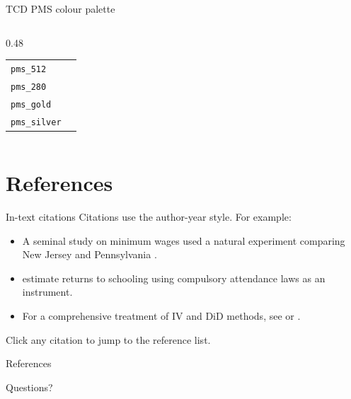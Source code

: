 \documentclass[aspectratio=169]{beamer}
\begin{document}
\begin{frame}{TCD PMS colour palette}
\begin{columns}[t]
\begin{column}{0.48\textwidth}
\begin{tabular}{ll}
      \texttt{pms\_512}      & \cellcolor{pms_512}\hspace{2cm} \\
      \texttt{pms\_280}      & \cellcolor{pms_280}\hspace{2cm} \\
      \texttt{pms\_gold}     & \cellcolor{pms_gold}\hspace{2cm} \\
      \texttt{pms\_silver}   & \cellcolor{pms_silver}\hspace{2cm} \\
      \bottomrule
    \end{tabular}
  \end{column}
\end{columns}
\end{frame}

\section{References}

\begin{frame}{In-text citations}
Citations use the author-year style. For example:

\begin{itemize}
  \item A seminal study on minimum wages used a natural experiment
        comparing New Jersey and Pennsylvania \citep{card1994}.
  \item \citet{angrist1991} estimate returns to schooling using compulsory attendance
        laws as an instrument.
  \item For a comprehensive treatment of IV and DiD methods, see \citet{angrist2009}
        or \citet{wooldridge2010}.
\end{itemize}

\vspace{\baselineskip}
{\small Click any citation to jump to the reference list.}
\end{frame}

\begin{frame}[allowframebreaks]{References}


\end{frame}

\begin{frame}[standout]
Questions?
\end{frame}
\end{document}
